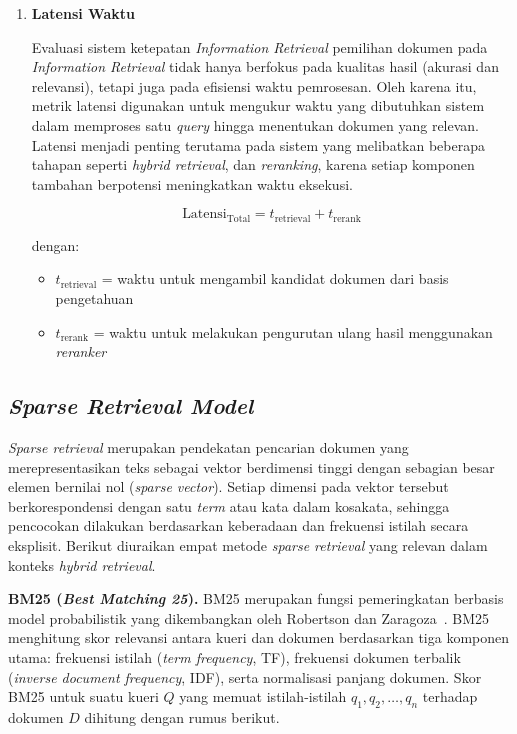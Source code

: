 \begin{enumerate}
	\item \textbf{Latensi Waktu}

	Evaluasi sistem ketepatan \textit{Information Retrieval} pemilihan dokumen pada \textit{Information Retrieval} tidak hanya berfokus pada kualitas hasil (akurasi dan relevansi), tetapi juga pada efisiensi waktu pemrosesan. Oleh karena itu, metrik latensi digunakan untuk mengukur waktu yang dibutuhkan sistem dalam memproses satu \textit{query} hingga menentukan dokumen yang relevan. Latensi menjadi penting terutama pada sistem yang melibatkan beberapa tahapan seperti \textit{hybrid retrieval}, dan \textit{reranking}, karena setiap komponen tambahan berpotensi meningkatkan waktu eksekusi.

	\begin{equation}
		\text{Latensi}_{\text{Total}} = t_{\text{retrieval}} + t_{\text{rerank}}
	\end{equation}

	dengan:
	\begin{itemize}
		\item $t_{\text{retrieval}}$ = waktu untuk mengambil kandidat dokumen dari basis pengetahuan
		\item $t_{\text{rerank}}$ = waktu untuk melakukan pengurutan ulang hasil menggunakan \textit{reranker}
	\end{itemize}
\end{enumerate}

\subsection{\textit{Sparse Retrieval Model}}

\textit{Sparse retrieval} merupakan pendekatan pencarian dokumen yang merepresentasikan teks sebagai vektor berdimensi tinggi dengan sebagian besar elemen bernilai nol (\textit{sparse vector}). Setiap dimensi pada vektor tersebut berkorespondensi dengan satu \textit{term} atau kata dalam kosakata, sehingga pencocokan dilakukan berdasarkan keberadaan dan frekuensi istilah secara eksplisit. Berikut diuraikan empat metode \textit{sparse retrieval} yang relevan dalam konteks \textit{hybrid retrieval}.

\textbf{BM25 (\textit{Best Matching 25}).} BM25 merupakan fungsi pemeringkatan berbasis model probabilistik yang dikembangkan oleh Robertson dan Zaragoza~\cite{robertson2009probabilistic}. BM25 menghitung skor relevansi antara kueri dan dokumen berdasarkan tiga komponen utama: frekuensi istilah (\textit{term frequency}, TF), frekuensi dokumen terbalik (\textit{inverse document frequency}, IDF), serta normalisasi panjang dokumen. Skor BM25 untuk suatu kueri $Q$ yang memuat istilah-istilah $q_1, q_2, \ldots, q_n$ terhadap dokumen $D$ dihitung dengan rumus berikut.

